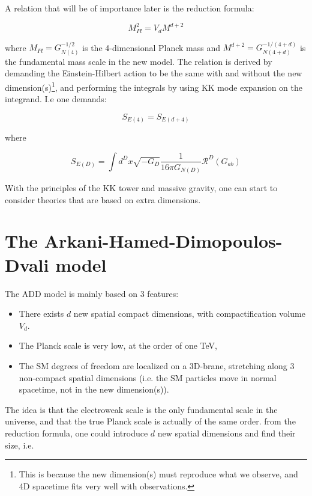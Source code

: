 \documentclass[11pt,a4paper]{article}
\begin{document}
A relation that will be of importance later is the reduction formula:

\begin{equation}
	M_{Pl}^2 = V_dM^{d+2}
\end{equation}

where $M_{Pl} = G_{N(4)}^{-1/2}$ is the 4-dimensional Planck mass and $M^{d+2} = G_{N(4+d)}^{-1/(4+d)}$ is the fundamental mass scale in the new model. The relation is derived by demanding the Einstein-Hilbert action to be the same with and without the new dimension(s)\footnote{This is because the new dimension(s) must reproduce what we observe, and 4D spacetime fits very well with observations.}, and performing the integrals by using KK mode expansion on the integrand. I.e one demands:

\begin{equation}
	S_{E(4)} = S_{E(d+4)}
\end{equation}

where

\begin{equation}
	S_{E(D)} = \int d^D x\sqrt{-G_D} \frac{1}{16\pi G_{N(D)}}\mathcal{R}^{D}(G_{ab})
\end{equation}

With the principles of the KK tower and massive gravity, one can start to consider theories that are based on extra dimensions.

\section{The Arkani-Hamed-Dimopoulos-Dvali model}
The ADD model is mainly based on 3 features:

\begin{itemize}
	\item There exists $d$ new spatial compact dimensions, with compactification volume $V_d$.
	\item The Planck scale is very low, at the order of one TeV,
	\item The SM degrees of freedom are localized on a 3D-brane, stretching along 3 non-compact spatial dimensions (i.e. the SM particles move in normal spacetime, not in the new dimension(s)).
\end{itemize}

The idea is that the electroweak scale is the only fundamental scale in the universe, and that the true Planck scale is actually of the same order. from the reduction formula, one could introduce $d$ new spatial dimensions and find their size, i.e.
\end{document}
